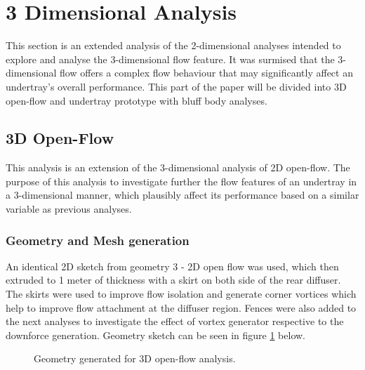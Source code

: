 \newpage
\section{3 Dimensional Analysis}
\noindent This section is an extended analysis of the 2-dimensional analyses intended to explore and analyse the 3-dimensional flow feature. It was surmised that the 3-dimensional flow offers a complex flow behaviour that may significantly affect an undertray's overall performance. This part of the paper will be divided into 3D open-flow and undertray prototype with bluff body analyses.


\subsection{3D Open-Flow}
This analysis is an extension of the 3-dimensional analysis of 2D open-flow. The purpose of this analysis to investigate further the flow features of an undertray in a 3-dimensional manner, which plausibly affect its performance based on a similar variable as previous analyses.

\subsubsection{Geometry and Mesh generation}
An identical 2D sketch from geometry 3 - 2D open flow was used, which then extruded to 1 meter of thickness with a skirt on both side of the rear diffuser. The skirts were used to improve flow isolation and generate corner vortices which help to improve flow attachment at the diffuser region. Fences were also added to the next analyses to investigate the effect of vortex generator respective to the downforce generation. Geometry sketch can be seen in figure \ref{fig:3D_OF_GEOM} below. 

\begin{figure}[!h]
    \centering
    \noindent{}
    \caption{Geometry generated for 3D open-flow analysis.}
    \label{fig:3D_OF_GEOM}
\end{figure}

